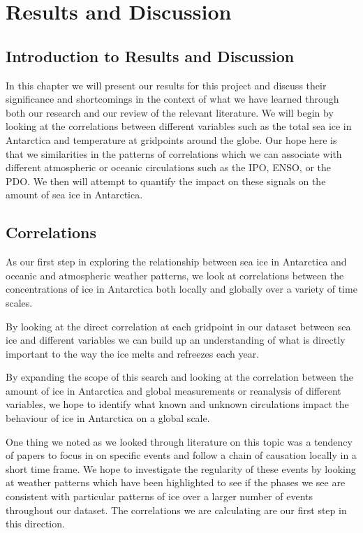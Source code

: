 \part{Results and Discussion}
\label{Chap:Results}

\chapter{Introduction to Results and Discussion}
In this chapter we will present our results for this project and discuss their significance and shortcomings in the context of what we have learned through both our research and our review of the relevant literature. We will begin by looking at the correlations between different variables such as the total sea ice in Antarctica and temperature at gridpoints around the globe. Our hope here is that we similarities in the patterns of correlations which we can associate with different atmospheric or oceanic circulations such as the IPO, ENSO, or the PDO. We then will attempt to quantify the impact on these signals on the amount of sea ice in Antarctica.

\chapter{Correlations}
As our first step in exploring the relationship between sea ice in Antarctica and oceanic and atmospheric weather patterns, we look at correlations between the concentrations of ice in Antarctica both locally and globally over a variety of time scales. 

By looking at the direct correlation at each gridpoint in our dataset between sea ice and different variables we can build up an understanding of what is directly important to the way the ice melts and refreezes each year.

By expanding the scope of this search and looking at the correlation between the amount of ice in Antarctica and global measurements or reanalysis of different variables, we hope to identify what known and unknown circulations impact the behaviour of ice in Antarctica on a global scale.

One thing we noted as we looked through literature on this topic was a tendency of papers to focus in on specific events and follow a chain of causation locally in a short time frame. We hope to investigate the regularity of these events by looking at weather patterns which have been highlighted to see if the phases we see are consistent with particular patterns of ice over a larger number of events throughout our dataset. The correlations we are calculating are our first step in this direction.
\newpage

\newpage

\newpage

\newpage

\newpage

\newpage


